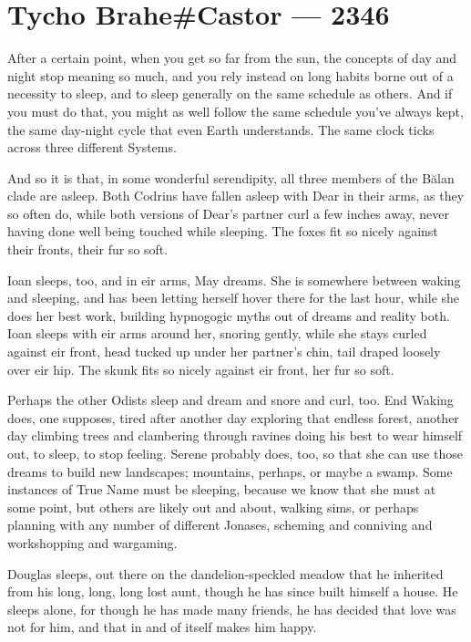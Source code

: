\hypertarget{tycho-brahecastor-2346}{%
\chapter{Tycho Brahe\#Castor — 2346}\label{tycho-brahecastor-2346}}

After a certain point, when you get so far from the sun, the concepts of day and night stop meaning so much, and you rely instead on long habits borne out of a necessity to sleep, and to sleep generally on the same schedule as others. And if you must do that, you might as well follow the same schedule you've always kept, the same day-night cycle that even Earth understands. The same clock ticks across three different Systems.

And so it is that, in some wonderful serendipity, all three members of the Bălan clade are asleep. Both Codrins have fallen asleep with Dear in their arms, as they so often do, while both versions of Dear's partner curl a few inches away, never having done well being touched while sleeping. The foxes fit so nicely against their fronts, their fur so soft.

Ioan sleeps, too, and in eir arms, May dreams. She is somewhere between waking and sleeping, and has been letting herself hover there for the last hour, while she does her best work, building hypnogogic myths out of dreams and reality both. Ioan sleeps with eir arms around her, snoring gently, while she stays curled against eir front, head tucked up under her partner's chin, tail draped loosely over eir hip. The skunk fits so nicely against eir front, her fur so soft.

Perhaps the other Odists sleep and dream and snore and curl, too. End Waking does, one supposes, tired after another day exploring that endless forest, another day climbing trees and clambering through ravines doing his best to wear himself out, to sleep, to stop feeling. Serene probably does, too, so that she can use those dreams to build new landscapes; mountains, perhaps, or maybe a swamp. Some instances of True Name must be sleeping, because we know that she must at some point, but others are likely out and about, walking sims, or perhaps planning with any number of different Jonases, scheming and conniving and workshopping and wargaming.

Douglas sleeps, out there on the dandelion-speckled meadow that he inherited from his long, long, long lost aunt, though he has since built himself a house. He sleeps alone, for though he has made many friends, he has decided that love was not for him, and that in and of itself makes him happy.

